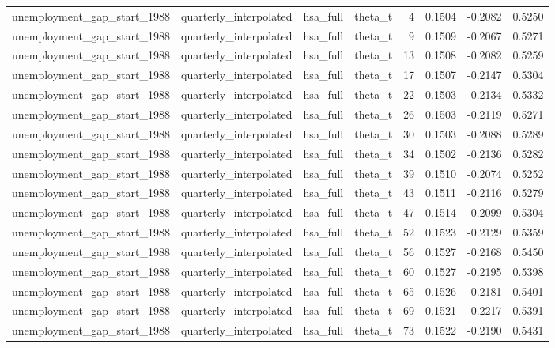 \begin{tabular}{llllrrrr}
unemployment\_gap\_start\_1988 & quarterly\_interpolated & hsa\_full & theta\_t & 4 & 0.1504 & -0.2082 & 0.5250 \\
unemployment\_gap\_start\_1988 & quarterly\_interpolated & hsa\_full & theta\_t & 9 & 0.1509 & -0.2067 & 0.5271 \\
unemployment\_gap\_start\_1988 & quarterly\_interpolated & hsa\_full & theta\_t & 13 & 0.1508 & -0.2082 & 0.5259 \\
unemployment\_gap\_start\_1988 & quarterly\_interpolated & hsa\_full & theta\_t & 17 & 0.1507 & -0.2147 & 0.5304 \\
unemployment\_gap\_start\_1988 & quarterly\_interpolated & hsa\_full & theta\_t & 22 & 0.1503 & -0.2134 & 0.5332 \\
unemployment\_gap\_start\_1988 & quarterly\_interpolated & hsa\_full & theta\_t & 26 & 0.1503 & -0.2119 & 0.5271 \\
unemployment\_gap\_start\_1988 & quarterly\_interpolated & hsa\_full & theta\_t & 30 & 0.1503 & -0.2088 & 0.5289 \\
unemployment\_gap\_start\_1988 & quarterly\_interpolated & hsa\_full & theta\_t & 34 & 0.1502 & -0.2136 & 0.5282 \\
unemployment\_gap\_start\_1988 & quarterly\_interpolated & hsa\_full & theta\_t & 39 & 0.1510 & -0.2074 & 0.5252 \\
unemployment\_gap\_start\_1988 & quarterly\_interpolated & hsa\_full & theta\_t & 43 & 0.1511 & -0.2116 & 0.5279 \\
unemployment\_gap\_start\_1988 & quarterly\_interpolated & hsa\_full & theta\_t & 47 & 0.1514 & -0.2099 & 0.5304 \\
unemployment\_gap\_start\_1988 & quarterly\_interpolated & hsa\_full & theta\_t & 52 & 0.1523 & -0.2129 & 0.5359 \\
unemployment\_gap\_start\_1988 & quarterly\_interpolated & hsa\_full & theta\_t & 56 & 0.1527 & -0.2168 & 0.5450 \\
unemployment\_gap\_start\_1988 & quarterly\_interpolated & hsa\_full & theta\_t & 60 & 0.1527 & -0.2195 & 0.5398 \\
unemployment\_gap\_start\_1988 & quarterly\_interpolated & hsa\_full & theta\_t & 65 & 0.1526 & -0.2181 & 0.5401 \\
unemployment\_gap\_start\_1988 & quarterly\_interpolated & hsa\_full & theta\_t & 69 & 0.1521 & -0.2217 & 0.5391 \\
unemployment\_gap\_start\_1988 & quarterly\_interpolated & hsa\_full & theta\_t & 73 & 0.1522 & -0.2190 & 0.5431 \\

\end{tabular}
